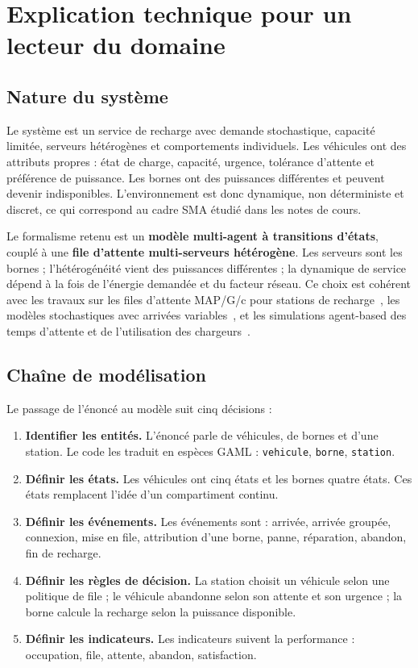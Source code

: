 \documentclass[11pt]{article}
\begin{document}
\section{Explication technique pour un lecteur du domaine}

\subsection{Nature du système}

Le système est un service de recharge avec demande stochastique, capacité limitée, serveurs hétérogènes et comportements individuels. Les véhicules ont des attributs propres : état de charge, capacité, urgence, tolérance d'attente et préférence de puissance. Les bornes ont des puissances différentes et peuvent devenir indisponibles. L'environnement est donc dynamique, non déterministe et discret, ce qui correspond au cadre SMA étudié dans les notes de cours.

Le formalisme retenu est un \textbf{modèle multi-agent à transitions d'états}, couplé à une \textbf{file d'attente multi-serveurs hétérogène}. Les serveurs sont les bornes ; l'hétérogénéité vient des puissances différentes ; la dynamique de service dépend à la fois de l'énergie demandée et du facteur réseau. Ce choix est cohérent avec les travaux sur les files d'attente MAP/G/c pour stations de recharge~\cite{farkas2018}, les modèles stochastiques avec arrivées variables~\cite{kim2017}, et les simulations agent-based des temps d'attente et de l'utilisation des chargeurs~\cite{garcia2018,karlsson2023}.

\subsection{Chaîne de modélisation}

Le passage de l'énoncé au modèle suit cinq décisions :

\begin{enumerate}
  \item \textbf{Identifier les entités.} L'énoncé parle de véhicules, de bornes et d'une station. Le code les traduit en espèces GAML : \texttt{vehicule}, \texttt{borne}, \texttt{station}.
  \item \textbf{Définir les états.} Les véhicules ont cinq états et les bornes quatre états. Ces états remplacent l'idée d'un compartiment continu.
  \item \textbf{Définir les événements.} Les événements sont : arrivée, arrivée groupée, connexion, mise en file, attribution d'une borne, panne, réparation, abandon, fin de recharge.
  \item \textbf{Définir les règles de décision.} La station choisit un véhicule selon une politique de file ; le véhicule abandonne selon son attente et son urgence ; la borne calcule la recharge selon la puissance disponible.
  \item \textbf{Définir les indicateurs.} Les indicateurs suivent la performance : occupation, file, attente, abandon, satisfaction.
\end{enumerate}
\end{document}
